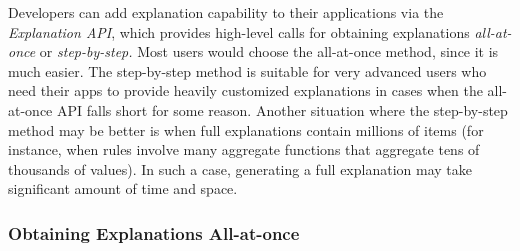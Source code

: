 Developers can add explanation capability to their applications
via the \emph{Explanation API}, which provides high-level calls for
obtaining explanations \emph{all-at-once} or \emph{step-by-step.}
Most users would choose the all-at-once method, since it is much easier.
The step-by-step method is suitable for very advanced users who need their
apps to provide heavily customized explanations in cases when the
all-at-once API falls short for some reason.
Another situation where the step-by-step method may be better is when full
explanations contain millions of items (for instance, when rules involve
many aggregate functions that aggregate tens of thousands of values).
In such a case, generating a full explanation may take significant amount
of time and space.

\subsubsection{Obtaining Explanations All-at-once}

